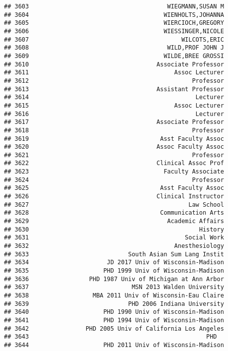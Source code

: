 \documentclass[
]{article}
\begin{document}
\begin{verbatim}
## 3603                                       WIEGMANN,SUSAN M
## 3604                                      WIENHOLTS,JOHANNA
## 3605                                      WIERCIOCH,GREGORY
## 3606                                      WIESSINGER,NICOLE
## 3607                                           WILCOTS,ERIC
## 3608                                       WILD,PROF JOHN J
## 3609                                      WILDE,BREE GROSSI
## 3610                                    Associate Professor
## 3611                                         Assoc Lecturer
## 3612                                              Professor
## 3613                                    Assistant Professor
## 3614                                               Lecturer
## 3615                                         Assoc Lecturer
## 3616                                               Lecturer
## 3617                                    Associate Professor
## 3618                                              Professor
## 3619                                     Asst Faculty Assoc
## 3620                                    Assoc Faculty Assoc
## 3621                                              Professor
## 3622                                    Clinical Assoc Prof
## 3623                                      Faculty Associate
## 3624                                              Professor
## 3625                                     Asst Faculty Assoc
## 3626                                    Clinical Instructor
## 3627                                             Law School
## 3628                                     Communication Arts
## 3629                                       Academic Affairs
## 3630                                                History
## 3631                                            Social Work
## 3632                                         Anesthesiology
## 3633                            South Asian Sum Lang Instit
## 3634                      JD 2017 Univ of Wisconsin-Madison
## 3635                     PHD 1999 Univ of Wisconsin-Madison
## 3636                 PHD 1987 Univ of Michigan at Ann Arbor
## 3637                             MSN 2013 Walden University
## 3638                  MBA 2011 Univ of Wisconsin-Eau Claire
## 3639                            PHD 2006 Indiana University
## 3640                     PHD 1990 Univ of Wisconsin-Madison
## 3641                     PHD 1994 Univ of Wisconsin-Madison
## 3642                PHD 2005 Univ of California Los Angeles
## 3643                                                  PHD  
## 3644                     PHD 2011 Univ of Wisconsin-Madison

\end{verbatim}
\end{document}
